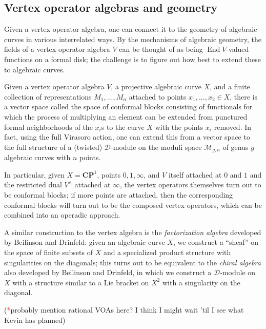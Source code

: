 \documentclass{article}
\newcommand{\CP}{\mathbold{CP}}
\newcommand{\Dd}{\mathcal{D}}
\newcommand{\tk}{\textcolor{red}{*}}
\DeclareMathOperator{\End}{End}
\begin{document}
\subsection{Vertex operator algebras and geometry}
Given a vertex operator algebra, one can connect it to the geometry of algebraic curves in various interrelated ways.  By the mechanisms of algebraic geometry, the fields of a vertex operator algebra $V$ can be thought of as being $\End V$-valued functions on a formal disk; the challenge is to figure out how best to extend these to algebraic curves.

Given a vertex operator algebra $V$, a projective algebraic curve $X$, and a finite collection of representations $M_1,...,M_n$ attached to points $x_1,...,x_2 \in X$, there is a vector space called the space of conformal blocks consisting of functionals for which the process of multiplying an element can be extended from punctured formal neighborhoods of the $x_i$s to the curve $X$ with the points $x_i$ removed.  In fact, using the full Virasoro action, one can extend this from a vector space to the full structure of a (twisted) $\Dd$-module on the moduli space $\mathcal{M}_{g,n}$ of genus $g$ algebraic curves with $n$ points.

In particular, given $X=\CP^1$, points $0,1,\infty$, and $V$ itself attached at $0$ and $1$ and the restricted dual $V^\wedge$ attached at $\infty$, the vertex operators themselves turn out to be conformal blocks; if more points are attached, then the corresponding conformal blocks will turn out to be the composed vertex operators, which can be combined into an operadic approach.

A similar construction to the vertex algebra is the \textit{factorization algebra} developed by Beilinson and Drinfeld: given an algebraic curve $X$, we construct a ``sheaf'' on the space of finite subsets of $X$ and a specialized product structure with singularities on the diagonals; this turns out to be equivalent to the \textit{chiral algebra} also developed by Beilinson and Drinfeld, in which we construct a $\Dd$-module on $X$ with a structure similar to a Lie bracket on $X^2$ with a singularity on the diagonal.

(\tk probably mention rational VOAs here?  I think I might wait 'til I see what Kevin has planned)
\end{document}
